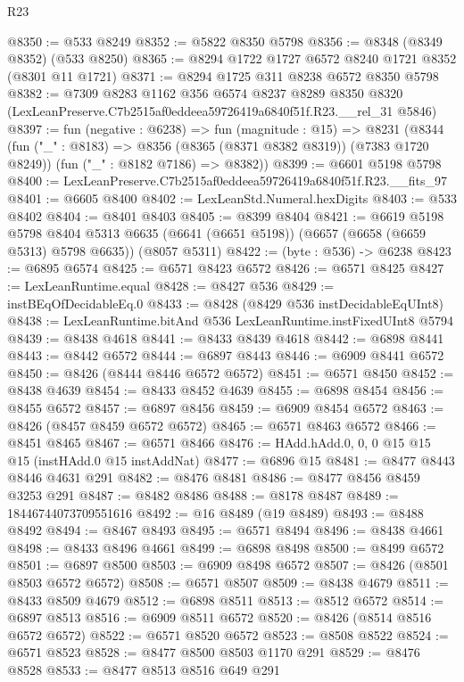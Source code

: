 \begin{lexlean}{R23}
\begin{coremodule}
@8350 := @533 @8249
@8352 := @5822 @8350 @5798
@8356 := @8348 (@8349 @8352) (@533 @8250)
@8365 := @8294 @1722 @1727 @6572 @8240 @1721 @8352 (@8301 @11 @1721)
@8371 := @8294 @1725 @311 @8238 @6572 @8350 @5798
@8382 := @7309
    @8283
    @1162
    @356
    @6574
    @8237
    @8289
    @8350
    @8320
    (LexLeanPreserve.C7b2515af0eddeea59726419a6840f51f.R23.__rel_31 @5846)
@8397 := fun (negative : @6238) =>
  fun (magnitude : @15) =>
  @8231
    (@8344
      (fun ("_" : @8183) => @8356 (@8365 (@8371 @8382 @8319)) (@7383 @1720 @8249))
      (fun ("_" : @8182 @7186) => @8382))
@8399 := @6601 @5198 @5798
@8400 := LexLeanPreserve.C7b2515af0eddeea59726419a6840f51f.R23.__fits_97
@8401 := @6605 @8400
@8402 := LexLeanStd.Numeral.hexDigits
@8403 := @533 @8402
@8404 := @8401 @8403
@8405 := @8399 @8404
@8421 := @6619
    @5198
    @5798
    @8404
    @5313
    @6635
    (@6641 (@6651 @5198))
    (@6657 (@6658 (@6659 @5313) @5798 @6635))
    (@8057 @5311)
@8422 := (byte : @536) -> @6238
@8423 := @6895 @6574
@8425 := @6571 @8423 @6572
@8426 := @6571 @8425
@8427 := LexLeanRuntime.equal
@8428 := @8427 @536
@8429 := instBEqOfDecidableEq.{0}
@8433 := @8428 (@8429 @536 instDecidableEqUInt8)
@8438 := LexLeanRuntime.bitAnd @536 LexLeanRuntime.instFixedUInt8 @5794
@8439 := @8438 @4618
@8441 := @8433 @8439 @4618
@8442 := @6898 @8441
@8443 := @8442 @6572
@8444 := @6897 @8443
@8446 := @6909 @8441 @6572
@8450 := @8426 (@8444 @8446 @6572 @6572)
@8451 := @6571 @8450
@8452 := @8438 @4639
@8454 := @8433 @8452 @4639
@8455 := @6898 @8454
@8456 := @8455 @6572
@8457 := @6897 @8456
@8459 := @6909 @8454 @6572
@8463 := @8426 (@8457 @8459 @6572 @6572)
@8465 := @6571 @8463 @6572
@8466 := @8451 @8465
@8467 := @6571 @8466
@8476 := HAdd.hAdd.{0, 0, 0} @15 @15 @15 (instHAdd.{0} @15 instAddNat)
@8477 := @6896 @15
@8481 := @8477 @8443 @8446 @4631 @291
@8482 := @8476 @8481
@8486 := @8477 @8456 @8459 @3253 @291
@8487 := @8482 @8486
@8488 := @8178 @8487
@8489 := 18446744073709551616
@8492 := @16 @8489 (@19 @8489)
@8493 := @8488 @8492
@8494 := @8467 @8493
@8495 := @6571 @8494
@8496 := @8438 @4661
@8498 := @8433 @8496 @4661
@8499 := @6898 @8498
@8500 := @8499 @6572
@8501 := @6897 @8500
@8503 := @6909 @8498 @6572
@8507 := @8426 (@8501 @8503 @6572 @6572)
@8508 := @6571 @8507
@8509 := @8438 @4679
@8511 := @8433 @8509 @4679
@8512 := @6898 @8511
@8513 := @8512 @6572
@8514 := @6897 @8513
@8516 := @6909 @8511 @6572
@8520 := @8426 (@8514 @8516 @6572 @6572)
@8522 := @6571 @8520 @6572
@8523 := @8508 @8522
@8524 := @6571 @8523
@8528 := @8477 @8500 @8503 @1170 @291
@8529 := @8476 @8528
@8533 := @8477 @8513 @8516 @649 @291

\end{coremodule}
\end{lexlean}
